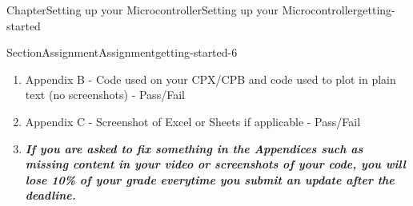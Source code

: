 \documentclass[oneside,10pt,]{book}
\newcommand{\alert}[1]{\textbf{\textit{#1}}}
\numberwithin{equation}{section}
\begin{document}
\begin{chapterptx}{Chapter}{Setting up your Microcontroller}{}{Setting up your Microcontroller}{}{}{getting-started}
\begin{sectionptx}{Section}{Assignment}{}{Assignment}{}{}{getting-started-6}
\begin{introduction}{}
\begin{enumerate}
\item{}Appendix B - Code used on your CPX\slash{}CPB and code used to plot in plain text (no screenshots) - Pass\slash{}Fail%
\item{}Appendix C - Screenshot of Excel or Sheets if applicable - Pass\slash{}Fail%
\item{}\alert{If you are asked to fix something in the Appendices such as missing content in your video or screenshots of your code, you will lose 10\% of your grade everytime you submit an update after the deadline.}%
\end{enumerate}
\end{introduction}%
\end{sectionptx}
\end{chapterptx}
%
%
\typeout{************************************************}
\typeout{************************************************}
%
\end{document}

